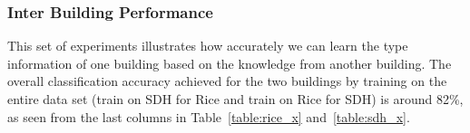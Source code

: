 \subsubsection{Inter Building Performance}
This set of experiments illustrates how accurately we can learn the type information of one building based on the knowledge from another building. The overall classification accuracy 
achieved for the two buildings by training on the entire data set (train on SDH for Rice and train on Rice for SDH) is around 82\%, as seen from the last columns in Table~\ref{table:rice_x} 
and~\ref{table:sdh_x}. 
